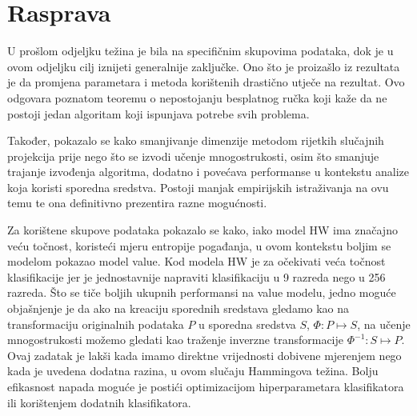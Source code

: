 \documentclass[times, utf8, diplomski]{fer}
\begin{document}
\section{Rasprava}
U prošlom odjeljku težina je bila na specifičnim skupovima podataka, dok je u ovom odjeljku cilj iznijeti generalnije zaključke. Ono što je proizašlo iz rezultata je da promjena parametara i metoda korištenih drastično utječe na rezultat. Ovo odgovara poznatom teoremu o nepostojanju besplatnog ručka  koji kaže da ne postoji jedan algoritam koji ispunjava potrebe svih problema.

Također, pokazalo se kako smanjivanje dimenzije metodom rijetkih slučajnih projekcija prije nego što se izvodi učenje mnogostrukosti, osim što smanjuje trajanje izvođenja algoritma, dodatno i povećava performanse u kontekstu analize koja koristi sporedna sredstva. Postoji manjak empirijskih istraživanja na ovu temu te ona definitivno prezentira razne mogućnosti.

Za korištene skupove podataka pokazalo se kako, iako model HW ima značajno veću točnost, koristeći mjeru entropije pogađanja, u ovom kontekstu boljim se modelom pokazao model value. Kod modela HW je za očekivati veća točnost klasifikacije jer je jednostavnije napraviti klasifikaciju u 9 razreda nego u 256 razreda. Što se tiče boljih ukupnih performansi na value modelu, jedno moguće objašnjenje je da ako na kreaciju sporednih sredstava gledamo kao na transformaciju originalnih podataka $P$ u sporedna sredstva $S$, $\Phi: P \mapsto S$, na učenje mnogostrukosti možemo gledati kao traženje inverzne transformacije $\Phi^{-1}: S \mapsto P$. Ovaj zadatak je lakši kada imamo direktne vrijednosti dobivene mjerenjem nego kada je uvedena dodatna razina, u ovom slučaju Hammingova težina.
Bolju efikasnost napada moguće je postići optimizacijom hiperparametara klasifikatora ili korištenjem dodatnih klasifikatora.
\end{document}

